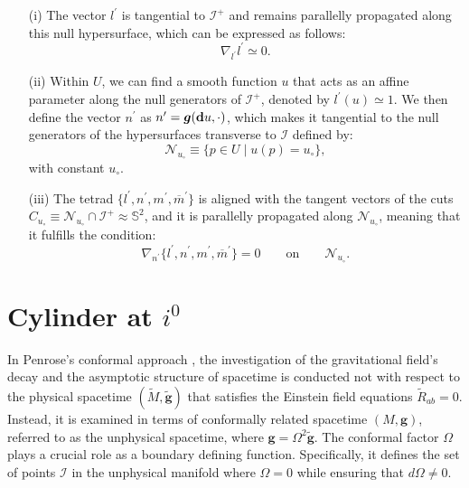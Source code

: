 \begin{itemize}
  \item[(i)] The vector $l^{\prime}$ is tangential to $\mathscr{I}^{+}$ and remains parallelly propagated along this null hypersurface, which can be expressed as follows:
   \begin{equation*}
   \nabla_{l^{\prime}} l^{\prime} \simeq 0.
   \end{equation*}
  \item[(ii)] Within $U$, we can find a smooth function $u$ that acts as an affine parameter along the null generators of $\mathscr{I}^{+}$, denoted by $l^{\prime}(u) \simeq 1$. We then define the vector $n^{\prime}$ as $n^{\prime}=\boldsymbol{g}(\mbox{\textbf{d}}u, \cdot )$, which makes it tangential to the null generators of the hypersurfaces transverse to $\mathscr{I}$ defined by:
  \begin{equation*}
  \mathcal{N}_{u_{\circ}}\equiv \{ p \in U \;| \; u(p)=u_{\circ}\},
  \end{equation*}
   with constant $u_{\circ}$.
  \item[(iii)] The tetrad $\{l^{\prime}, n^{\prime}, m^{\prime}, \overline{m}^{\prime}\}$ is aligned with the tangent vectors of the cuts ${C}_{u_{\circ}}\equiv \mathcal{N}_{u_{\circ}}\cap \mathscr{I}^{+} \approx \mathbb{S}^2$, and it is parallelly propagated along $\mathcal{N}_{u_{\circ}}$, meaning that it fulfills the condition:
  \begin{equation*}
  \nabla_{n^{\prime}}\{l^{\prime}, n^{\prime}, m^{\prime}, \overline{m}^{\prime}\}=0 \qquad \text{on} \qquad
  \mathcal{N}_{u_{\circ}}.
  \end{equation*}
  \end{itemize}

\chapter{Cylinder at $i^0$}
\label{chapter:cylinder}

In Penrose's conformal approach \cite{Pen63}, the investigation of the gravitational field's decay and the asymptotic structure of spacetime is conducted not with respect to the physical spacetime $(\tilde{{M}}, \tilde{\boldsymbol{g}})$ that satisfies the Einstein field equations $\tilde{R}_{a b}=0$. Instead, it is examined in terms of conformally related spacetime $({M}, \boldsymbol{g})$, referred to as the unphysical spacetime, where $\boldsymbol{g}=\Omega^2 \tilde{\boldsymbol{g}}$. The conformal factor $\Omega$ plays a crucial role as a boundary defining function. Specifically, it defines the set of points $\mathscr{I}$ in the unphysical manifold where $\Omega = 0$ while ensuring that $d\Omega \neq 0$. 

